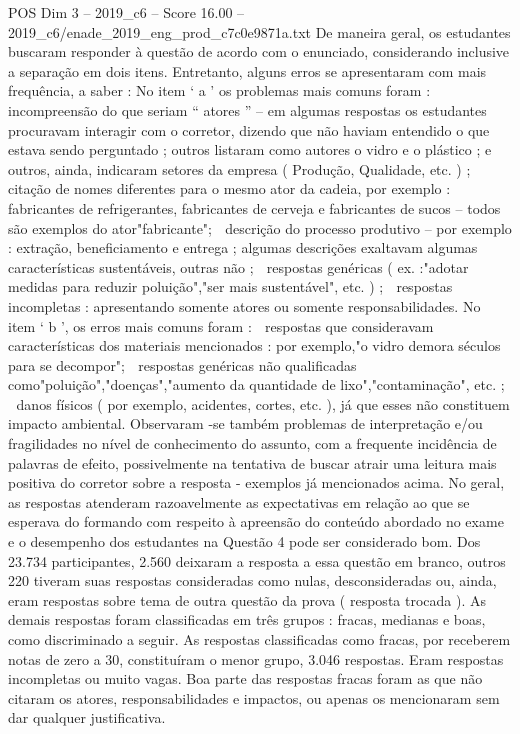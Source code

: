 \begin{textsample}{POS Dim 3 – 2019\_c6 – Score 16.00 – 2019\_c6/enade\_2019\_eng\_prod\_c7c0e9871a.txt}
De maneira geral, os estudantes buscaram responder à questão de acordo com o enunciado, considerando inclusive a separação em dois itens.
Entretanto, alguns erros se apresentaram com mais frequência, a saber : No item ‘ a ’ os problemas mais comuns foram :  incompreensão do que seriam “ atores ” – em algumas respostas os estudantes procuravam interagir com o corretor, dizendo que não haviam entendido o que estava sendo perguntado ; outros listaram como autores o vidro e o plástico ; e outros, ainda, indicaram setores da empresa ( Produção, Qualidade, etc. ) ;  citação de nomes diferentes para o mesmo ator da cadeia, por exemplo : fabricantes de refrigerantes, fabricantes de cerveja e fabricantes de sucos – todos são exemplos do ator"fabricante";  descrição do processo produtivo – por exemplo : extração, beneficiamento e entrega ; algumas descrições exaltavam algumas características sustentáveis, outras não ;  respostas genéricas ( ex. :"adotar medidas para reduzir poluição","ser mais sustentável", etc. ) ;  respostas incompletas : apresentando somente atores ou somente responsabilidades.
No item ‘ b ’, os erros mais comuns foram :  respostas que consideravam características dos materiais mencionados : por exemplo,"o vidro demora séculos para se decompor";  respostas genéricas não qualificadas como"poluição","doenças","aumento da quantidade de lixo","contaminação", etc. ;  danos físicos ( por exemplo, acidentes, cortes, etc. ), já que esses não constituem impacto ambiental.
Observaram -se também problemas de interpretação e/ou fragilidades no nível de conhecimento do assunto, com a frequente incidência de palavras de efeito, possivelmente na tentativa de buscar atrair uma leitura mais positiva do corretor sobre a resposta - exemplos já mencionados acima.
No geral, as respostas atenderam razoavelmente as expectativas em relação ao que se esperava do formando com respeito à apreensão do conteúdo abordado no exame e o desempenho dos estudantes na Questão 4 pode ser considerado bom.
Dos 23.734 participantes, 2.560 deixaram a resposta a essa questão em branco, outros 220 tiveram suas respostas consideradas como nulas, desconsideradas ou, ainda, eram respostas sobre tema de outra questão da prova ( resposta trocada ).
As demais respostas foram classificadas em três grupos : fracas, medianas e boas, como discriminado a seguir.
As respostas classificadas como fracas, por receberem notas de zero a 30, constituíram o menor grupo, 3.046 respostas.
Eram respostas incompletas ou muito vagas.
Boa parte das respostas fracas foram as que não citaram os atores, responsabilidades e impactos, ou apenas os mencionaram sem dar qualquer justificativa.

\end{textsample}
